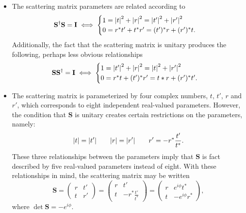 \documentclass[11pt, a4paper]{article}
\renewcommand{\vec}[1]{\bm{#1}}  %
\newcommand{\mat}[1]{\mathbf{#1}}  %
\renewcommand{\S}{\vec{S}}  %
\renewcommand{\SS}{\mat{S}}  %
\begin{document}
\begin{itemize}
    \item The scattering matrix parameters are related according to
    \begin{equation*}
        \SS^{\dagger} \SS = \mathbf{I} \iff 
        \begin{cases}
            1 = \abs{t}^{2} + \abs{r}^{2} = \abs{t'}^{2} + \abs{r'}^{2}\\
            0 = r^{*} t' + t^{*} r' = (t')^{*} r + (r')^{*}t.
        \end{cases} 
    \end{equation*}
    Additionally, the fact that the scattering matrix is unitary produces the following, perhaps less obvious relationships
    \begin{equation*}
        \SS \SS^{\dagger} = \mathbf{I} \iff 
        \begin{cases}
            1 = \abs{t'}^{2} + \abs{r}^{2} = \abs{t}^{2} + \abs{r'}^{2}\\
            0 = r^{*}t + (t')^{*}r' = t*r + (r')^{*}t'.
        \end{cases}  
    \end{equation*}
    
    \item The scattering matrix is parameterized by four complex numbers, $ t $, $ t' $, $ r $ and $ r' $, which corresponds to eight independent real-valued parameters. However, the condition that $ \S $ is unitary creates certain restrictions on the parameters, namely:
    \begin{equation*}
        \abs{t} = \abs{t'} \qquad \abs{r} = \abs{r'} \qquad r' = -r^{*}\frac{t'}{t^{*}}.
    \end{equation*}
    These three relationships between the parameters imply that $ \SS $ is fact described by five real-valued parameters instead of eight. With these relationships in mind, the scattering matrix may be written
    \begin{equation*}
        \SS = 
        \begin{pmatrix}
            r & t'\\
            t & r'
        \end{pmatrix}
        = 
        \begin{pmatrix}
            r & t'\\
            t & - r^{*}\frac{t'}{t^{*}}
        \end{pmatrix}
        = 
        \begin{pmatrix}
            r & e^{i\phi}t^{*}\\
            t & - e^{i\phi}r^{*}
        \end{pmatrix},
    \end{equation*}
    where $ \det \SS = -e^{i\phi} $.
    
    
\end{itemize}
\end{document}
